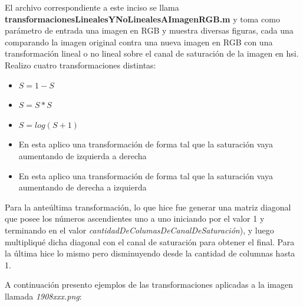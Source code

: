 \documentclass{article}
\begin{document}
El archivo correspondiente a este inciso se llama \textbf{transformacionesLinealesYNoLinealesAImagenRGB.m} y toma como parámetro de entrada una imagen en RGB y muestra diversas figuras, cada una comparando la imagen original contra una nueva imagen en RGB con una transformación lineal o no lineal sobre el canal de saturación de la imagen en hsi. Realizo cuatro transformaciones distintas:
\begin{itemize}
\item $S = 1 - S$
\item $S = S * S$
\item $S = log(S + 1)$
\item En esta aplico una transformación de forma tal que la saturación vaya aumentando de izquierda a derecha
\item En esta aplico una transformación de forma tal que la saturación vaya aumentando de derecha a izquierda
\end{itemize}

Para la anteúltima transformación, lo que hice fue generar una matriz diagonal que posee los números ascendientes uno a uno iniciando por el valor 1 y terminando en el valor \textit{cantidadDeColumasDeCanalDeSaturación}), y luego multipliqué dicha diagonal con el canal de saturación para obtener el final. Para la última hice lo mismo pero disminuyendo desde la cantidad de columnas hasta 1.

A continuación presento ejemplos de las transformaciones aplicadas a la imagen llamada \textit{1908xxx.png}:
\end{document}
